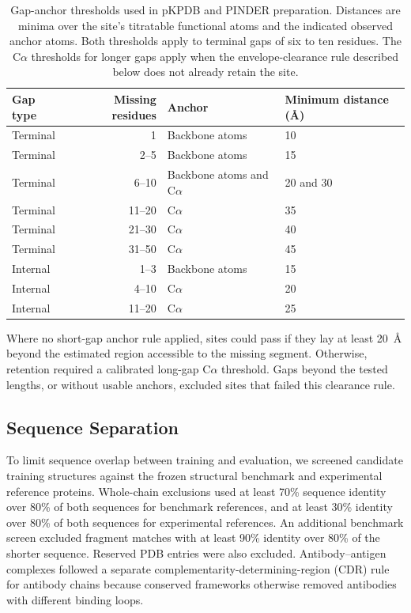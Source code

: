\begin{table}[htbp]
    \centering
    \small
    \begin{tabular}{lrll}
        \toprule
        Gap type & Missing residues & Anchor & Minimum distance (\AA) \\
        \midrule
        Terminal & 1 & Backbone atoms & 10 \\
        Terminal & 2--5 & Backbone atoms & 15 \\
        Terminal & 6--10 & Backbone atoms and C$\alpha$ & 20 and 30 \\
        Terminal & 11--20 & C$\alpha$ & 35 \\
        Terminal & 21--30 & C$\alpha$ & 40 \\
        Terminal & 31--50 & C$\alpha$ & 45 \\
        Internal & 1--3 & Backbone atoms & 15 \\
        Internal & 4--10 & C$\alpha$ & 20 \\
        Internal & 11--20 & C$\alpha$ & 25 \\
        \bottomrule
    \end{tabular}
    \caption{Gap-anchor thresholds used in pKPDB and PINDER preparation. Distances are minima over the site's titratable functional atoms and the indicated observed anchor atoms. Both thresholds apply to terminal gaps of six to ten residues. The C$\alpha$ thresholds for longer gaps apply when the envelope-clearance rule described below does not already retain the site.}
    \label{tab:jaxka-gap-masks}
\end{table}

Where no short-gap anchor rule applied, sites could pass if they lay at least 20~\AA{} beyond the estimated region accessible to the missing segment. Otherwise, retention required a calibrated long-gap C$\alpha$ threshold. Gaps beyond the tested lengths, or without usable anchors, excluded sites that failed this clearance rule.



\subsection{Sequence Separation}
\label{app:jaxka-sequence-separation}

To limit sequence overlap between training and evaluation, we screened candidate training structures against the frozen structural benchmark and experimental reference proteins. Whole-chain exclusions used at least 70\% sequence identity over 80\% of both sequences for benchmark references, and at least 30\% identity over 80\% of both sequences for experimental references. An additional benchmark screen excluded fragment matches with at least 90\% identity over 80\% of the shorter sequence. Reserved PDB entries were also excluded. Antibody--antigen complexes followed a separate complementarity-determining-region (CDR) rule for antibody chains because conserved frameworks otherwise removed antibodies with different binding loops.

